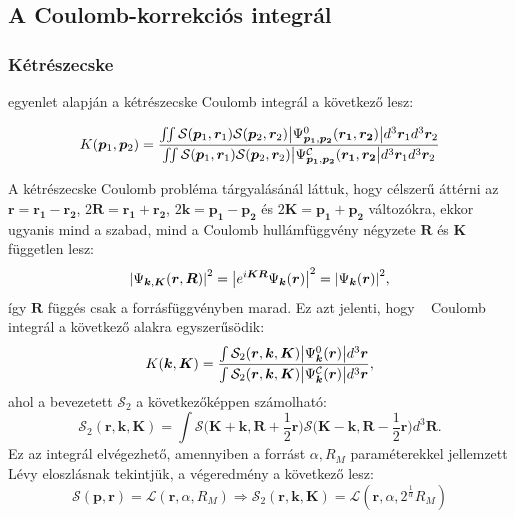 \documentclass[11pt,a4paper]{article}
\numberwithin{equation}{subsection}
\numberwithin{figure}{section}
\begin{document}
\subsection{A Coulomb-korrekciós integrál}

\subsubsection{Kétrészecske}
 egyenlet alapján a kétrészecske Coulomb integrál a következő lesz:

\begin{equation}
K(\bm{p}_1,\bm{p}_2)=
\frac{
\iint \mathcal{S}(\bm{p}_1, \bm{r}_1)\mathcal{S}(\bm{p}_2, \bm{r}_2)
\abs{\Psi^{0}_{\bm{p_1},\bm{p_2}}(\bm{r_1},\bm{r_2})} d^3 \bm{r}_1d^3 \bm{r}_2
}{\iint \mathcal{S}(\bm{p}_1, \bm{r}_1)\mathcal{S}(\bm{p}_2, \bm{r}_2)
\abs{\Psi^\mathcal{C}_{\bm{p_1},\bm{p_2}}(\bm{r_1},\bm{r_2}}d^3 \bm{r}_1d^3 \bm{r}_2}
\label{eq:Kn2}
\end{equation}

A kétrészecske Coulomb probléma tárgyalásánál láttuk, hogy célszerű áttérni az $\bm{r}=\bm{r_1}-\bm{r_2}$, $2\bm{R}=\bm{r_1}+\bm{r_2}$, $2\bm{k}=\bm{p_1}-\bm{p_2}$ és $2\bm{K}=\bm{p_1}+\bm{p_2}$ változókra, ekkor ugyanis mind a szabad, mind a Coulomb hullámfüggvény négyzete $\bm{R}$ és  $\bm{K}$ független lesz:
\begin{equation}
\abs{\Psi_{\bm{k},\bm{K}}(\bm{r},\bm{R})}^2 = \abs{e^{i\bm{KR}}\Psi_{\bm{k}}(\bm{r})}^2=\abs{\Psi_{\bm{k}}(\bm{r})}^2,
\end{equation}
így $\bm{R}$ függés csak a forrásfüggvényben marad. Ez azt jelenti, hogy ~ Coulomb integrál a következő alakra egyszerűsödik:
\begin{equation}
K(\bm{k},\bm{K})=
\frac{
\int \mathcal{S}_2(\bm{r}, \bm{k}, \bm{K})
\abs{\Psi^{0}_{\bm{k}}(\bm{r})} d^3 \bm{r}
}{\int \mathcal{S}_2(\bm{r}, \bm{k}, \bm{K})
\abs{\Psi^{\mathcal{C}}_{\bm{k}}(\bm{r})} d^3 \bm{r}},
\label{eq:K2}
\end{equation}
ahol a bevezetett $\mathcal{S}_2$ a következőképpen számolható:
\begin{equation}
\mathcal{S}_2(\bm{r}, \bm{k},\bm{K}) = \int \mathcal{S}\Big(\bm{K}+\bm{k}, \bm{R}+\frac{1}{2}\bm{r}\Big)\mathcal{S}\Big(\bm{K}-\bm{k}, \bm{R}-\frac{1}{2}\bm{r}\Big)d^3\bm{R}.
\end{equation}
Ez az integrál elvégezhető, amennyiben a forrást $\alpha, R_M$ paraméterekkel jellemzett Lévy eloszlásnak tekintjük, a végeredmény a következő lesz:
\begin{equation}
\mathcal{S}(\bm{p},\bm{r})=\mathcal{L}(\bm{r},\alpha,R_M)\Longrightarrow \mathcal{S}_2(\bm{r},\bm{k},\bm{K})=\mathcal{L}(\bm{r}, \alpha, 2^{\frac{1}{\alpha}}R_M)
\end{equation}
\end{document}

